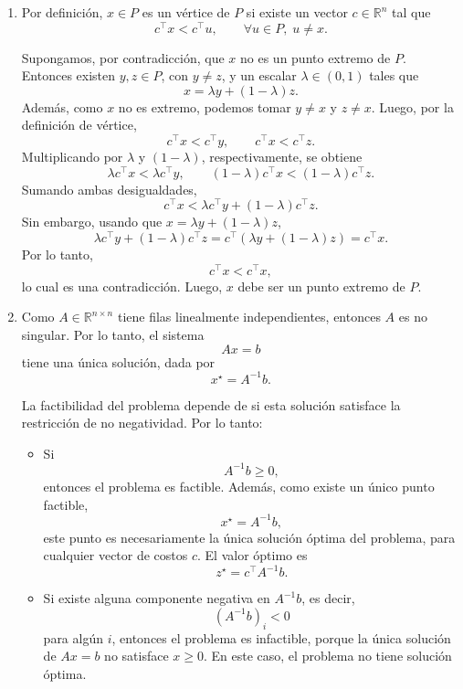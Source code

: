 \begin{enumerate}

\item
Por definición, $x \in P$ es un vértice de $P$ si existe un vector $c \in \mathbb{R}^n$ tal que
    \[
        c^\top x < c^\top u, \qquad \forall u \in P, \; u \neq x.
    \]

    Supongamos, por contradicción, que $x$ no es un punto extremo de $P$. Entonces existen
    $y,z \in P$, con $y \neq z$, y un escalar $\lambda \in (0,1)$ tales que
    \[
        x = \lambda y + (1-\lambda)z.
    \]
    Además, como $x$ no es extremo, podemos tomar $y \neq x$ y $z \neq x$. Luego, por la
    definición de vértice,
    \[
        c^\top x < c^\top y,
        \qquad
        c^\top x < c^\top z.
    \]
    Multiplicando por $\lambda$ y $(1-\lambda)$, respectivamente, se obtiene
    \[
        \lambda c^\top x < \lambda c^\top y,
        \qquad
        (1-\lambda)c^\top x < (1-\lambda)c^\top z.
    \]
    Sumando ambas desigualdades,
    \[
        c^\top x
        <
        \lambda c^\top y + (1-\lambda)c^\top z.
    \]
    Sin embargo, usando que $x = \lambda y + (1-\lambda)z$,
    \[
        \lambda c^\top y + (1-\lambda)c^\top z
        =
        c^\top\left(\lambda y + (1-\lambda)z\right)
        =
        c^\top x.
    \]
    Por lo tanto,
    \[
        c^\top x < c^\top x,
    \]
    lo cual es una contradicción. Luego, $x$ debe ser un punto extremo de $P$.

\item
Como $A \in \mathbb{R}^{n \times n}$ tiene filas linealmente independientes, entonces $A$ es no singular.
    Por lo tanto, el sistema
    \[
        Ax=b
    \]
    tiene una única solución, dada por
    \[
        x^\star = A^{-1}b.
    \]

    La factibilidad del problema depende de si esta solución satisface la restricción de no negatividad.
    Por lo tanto:

    \begin{itemize}
        \item Si
        \[
            A^{-1}b \geq 0,
        \]
        entonces el problema es factible. Además, como existe un único punto factible,
        \[
            x^\star = A^{-1}b,
        \]
        este punto es necesariamente la única solución óptima del problema, para cualquier vector de costos $c$.
        El valor óptimo es
        \[
            z^\star = c^\top A^{-1}b.
        \]

        \item Si existe alguna componente negativa en $A^{-1}b$, es decir,
        \[
            (A^{-1}b)_i < 0
        \]
        para algún $i$, entonces el problema es infactible, porque la única solución de $Ax=b$
        no satisface $x \geq 0$. En este caso, el problema no tiene solución óptima.
    \end{itemize}


\end{enumerate}
